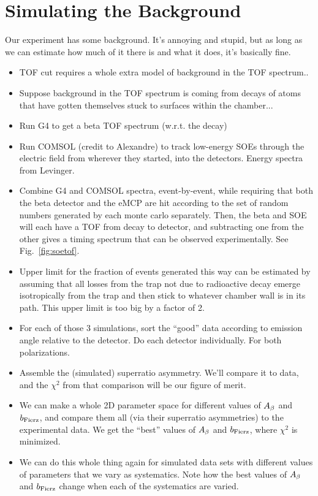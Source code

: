 \section{Simulating the Background}
\label{sec:tof_bg}
Our experiment has some background.  It's annoying and stupid, but as long as we can estimate how much of it there is and what it does, it's basically fine.

\begin{itemize}
		\item TOF cut requires a whole extra model of background in the TOF spectrum..
		\item Suppose background in the TOF spectrum is coming from decays of atoms that have gotten themselves stuck to surfaces within the chamber...
		\item Run G4 to get a beta TOF spectrum (w.r.t. the decay)
		\item Run COMSOL (credit to Alexandre) to track low-energy SOEs through the electric field from wherever they started, into the detectors.  Energy spectra from Levinger.
		\item Combine G4 and COMSOL spectra, event-by-event, while requiring that both the beta detector and the eMCP are hit according to the set of random numbers generated by each monte carlo separately.  Then, the beta and SOE will each have a TOF from decay to detector, and subtracting one from the other gives a timing spectrum that can be observed experimentally.  See Fig.~\ref{fig:soetof}.
		\item Upper limit for the fraction of events generated this way can be estimated by assuming that all losses from the trap not due to radioactive decay emerge isotropically from the trap and then stick to whatever chamber wall is in its path.  This upper limit is too big by a factor of 2.
	\item For each of those 3 simulations, sort the ``good'' data according to emission angle relative to the detector.  Do each detector individually.  For both polarizations.
	\item Assemble the (simulated) superratio asymmetry.  We'll compare it to data, and the $\chi^2$ from that comparison will be our figure of merit.  
	\item We can make a whole 2D parameter space for different values of $A_{\beta}$ and $b_{\mathrm{Fierz}}$, and compare them all (via their superratio asymmetries) to the experimental data.  We get the ``best'' values of $A_{\beta}$ and $b_{\mathrm{Fierz}}$, where $\chi^2$ is minimized.
	\item We can do this whole thing again for simulated data sets with different values of parameters that we vary as systematics.  Note how the best values of $A_{\beta}$ and $b_{\mathrm{Fierz}}$ change when each of the systematics are varied.
\end{itemize}


